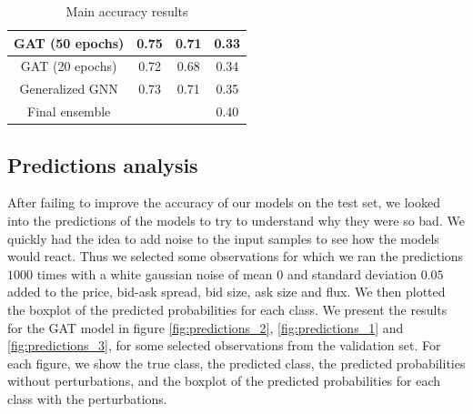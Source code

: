 \documentclass[switch, 11pt]{article}
\begin{document}
\begin{multicols}{2}
\begin{table}[H]
\begin{center}
{\begin{tabular}{|c|c|c|c|}
                    GAT (50 epochs)            & 0.75                   & 0.71                     & 0.33               \\
                    \hline
                    GAT (20 epochs)            & 0.72                   & 0.68                     & 0.34               \\
                    \hline
                    Generalized GNN            & 0.73                   & 0.71                     & 0.35               \\
                    \hline
                    Final ensemble             &                        &                          & 0.40               \\
                    \hline
                \end{tabular}
            }
        \end{center}
        \caption{Main accuracy results}
        \label{tab:results}
    \end{table}


    \subsection{Predictions analysis}

    After failing to improve the accuracy of our models on the test set, we looked into the predictions of the models to try to understand why they were so bad. We quickly had the idea to add noise to the input samples to see how the models would react. Thus we selected some observations for which we ran the predictions $1000$ times with a white gaussian noise of mean $0$ and standard deviation $0.05$ added to the price, bid-ask spread, bid size, ask size and flux. We then plotted the boxplot of the predicted probabilities for each class. We present the results for the GAT model in figure \ref{fig:predictions_2}, \ref{fig:predictions_1} and \ref{fig:predictions_3}, for some selected observations from the validation set. For each figure, we show the true class, the predicted class, the predicted probabilities without perturbations, and the boxplot of the predicted probabilities for each class with the perturbations.


\end{multicols}
\end{document}
